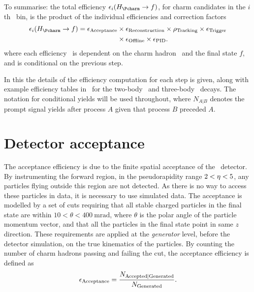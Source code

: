 To summarise: the total efficiency $\eff_{i}(\decay{\PHc}{f})$, for charm candidates in the $i$th \pTy\ bin, is 
the product of the individual efficiencies and correction factors
\begin{align}
  \eff_{i}(\decay{\PHc}{f}) = \effacc &\times \effreco \times \efftracking \times \efftrig \nonumber\\
                                      &\times \effoffline \times \effpid.
  \label{eqn:prod:effs:total_eff}
\end{align}
where each efficiency \eff\ is dependent on the charm hadron \PHc\ and the 
final state $f$, and is conditional on the previous step.

In this  the details of the efficiency computation for each step is 
given, along with example efficiency tables in \pTy\ for the two-body \DzToKpi\ 
and three-body \DpToKpipi\ decays.
The notation for conditional yields will be used throughout, where $N_{A|B}$ 
denotes the prompt signal yields after process $A$ given that process $B$ 
preceded $A$.

\section{Detector acceptance}
\label{chap:prod:effs:acc}

The acceptance efficiency is due to the finite spatial acceptance of the \lhcb\ 
detector.
By instrumenting the forward region, in the pseudorapidity range $2 < \eta < 
5$, any particles flying outside this region are not detected.
As there is no way to access these particles in data, it is necessary to use 
simulated data.
The acceptance is modelled by a set of cuts requiring that all stable charged 
particles in the final state are within $10 < \theta < 
\SI{400}{\milli\radian}$, where $\theta$ is the polar angle of the particle 
momentum vector, and that all the particles in the final state point in same 
$z$ direction.
These requirements are applied at the \emph{generator} level, before the 
detector simulation, on the true kinematics of the particles.
By counting the number of charm hadrons passing and failing the cut, the 
acceptance efficiency is defined as
\begin{equation}
  \effacc = \frac{%
    N_{\text{Accepted}|\text{Generated}}
  }
  {%
    N_{\text{\text{Generated}}}
  }.
  \label{eqn:prod:effs:acc}
\end{equation}

